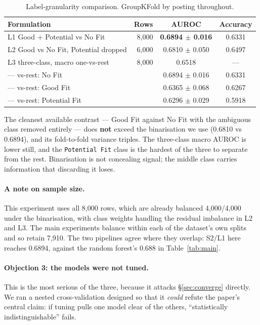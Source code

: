 \documentclass[11pt]{article}                      %
\newcommand{\tabfont}{\footnotesize}
\begin{document}
\begin{table}[h]
\centering\tabfont
\caption{Label-granularity comparison. GroupKFold by posting throughout.}
\label{tab:labels}
\begin{tabular}{lrcc}
\toprule
Formulation & Rows & AUROC & Accuracy \\
\midrule
L1 Good + Potential vs No Fit & 8{,}000 & \textbf{0.6894 $\pm$ 0.016} & 0.6331 \\
L2 Good vs No Fit, Potential dropped & 6{,}000 & 0.6810 $\pm$ 0.050 & 0.6497 \\
L3 three-class, macro one-vs-rest & 8{,}000 & 0.6518 & --- \\
\quad --- vs-rest: No Fit & & 0.6894 $\pm$ 0.016 & 0.6331 \\
\quad --- vs-rest: Good Fit & & 0.6365 $\pm$ 0.068 & 0.6267 \\
\quad --- vs-rest: Potential Fit & & 0.6296 $\pm$ 0.029 & 0.5918 \\
\bottomrule
\end{tabular}
\end{table}

The cleanest available contrast --- Good Fit against No Fit with the ambiguous
class removed entirely --- does \textbf{not} exceed the binarisation we use (0.6810
vs 0.6894), and its fold-to-fold variance triples. The three-class macro AUROC is
lower still, and the \texttt{Potential Fit} class is the hardest of the three to
separate from the rest. Binarisation is not concealing signal; the middle class
carries information that discarding it loses.

\paragraph{A note on sample size.}
This experiment uses all 8{,}000 rows, which are already balanced 4{,}000/4{,}000
under the binarisation, with class weights handling the residual imbalance in L2
and L3. The main experiments balance within each of the dataset's own splits and
so retain 7{,}910. The two pipelines agree where they overlap: S2/L1 here reaches
0.6894, against the random forest's 0.688 in Table~\ref{tab:main}.

\paragraph{Objection 3: the models were not tuned.}
This is the most serious of the three, because it attacks \S\ref{sec:converge}
directly. We ran a nested cross-validation designed so that it \emph{could}
refute the paper's central claim: if tuning pulls one model clear of the others,
``statistically indistinguishable'' fails.
\end{document}
